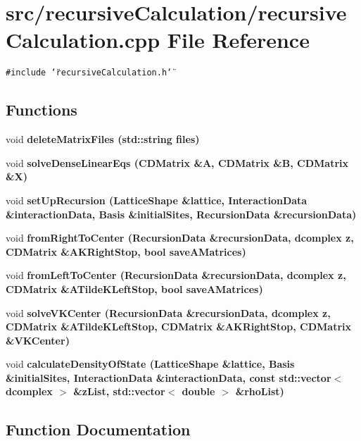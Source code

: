 \section{src/recursive\-Calculation/recursive\-Calculation.cpp File Reference}
\label{recursiveCalculation_8cpp}
{\tt \#include \char`\"{}recursive\-Calculation.h\char`\"{}}\par
\subsection*{Functions}
\begin{CompactItemize}
\item 
void \bf{delete\-Matrix\-Files} (std::string files)
\item 
void \bf{solve\-Dense\-Linear\-Eqs} (\bf{CDMatrix} \&A, \bf{CDMatrix} \&B, \bf{CDMatrix} \&X)
\item 
void \bf{set\-Up\-Recursion} (\bf{Lattice\-Shape} \&lattice, \bf{Interaction\-Data} \&interaction\-Data, \bf{Basis} \&initial\-Sites, \bf{Recursion\-Data} \&recursion\-Data)
\item 
void \bf{from\-Right\-To\-Center} (\bf{Recursion\-Data} \&recursion\-Data, \bf{dcomplex} z, \bf{CDMatrix} \&AKRight\-Stop, bool save\-AMatrices)
\item 
void \bf{from\-Left\-To\-Center} (\bf{Recursion\-Data} \&recursion\-Data, \bf{dcomplex} z, \bf{CDMatrix} \&ATilde\-KLeft\-Stop, bool save\-AMatrices)
\item 
void \bf{solve\-VKCenter} (\bf{Recursion\-Data} \&recursion\-Data, \bf{dcomplex} z, \bf{CDMatrix} \&ATilde\-KLeft\-Stop, \bf{CDMatrix} \&AKRight\-Stop, \bf{CDMatrix} \&VKCenter)
\item 
void \bf{calculate\-Density\-Of\-State} (\bf{Lattice\-Shape} \&lattice, \bf{Basis} \&initial\-Sites, \bf{Interaction\-Data} \&interaction\-Data, const std::vector$<$ \bf{dcomplex} $>$ \&z\-List, std::vector$<$ double $>$ \&rho\-List)
\end{CompactItemize}


\subsection{Function Documentation}
